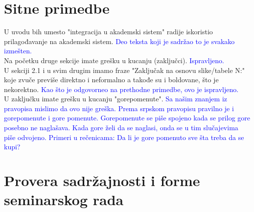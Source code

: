 \documentclass[a4paper]{report}
\newcommand{\odgovor}[1]{\textcolor{blue}{#1}}
\begin{document}
\section{Sitne primedbe}
U uvodu bih umesto "integracija u akademski sistem" radije iskoristio prilagođavanje na akademski sistem. \odgovor{Deo teksta koji je sadržao to je svakako izmešten.} \\
Na početku druge sekcije imate grešku u kucanju (zaključci). \odgovor{Ispravljeno.} \\
U sekciji 2.1 i u svim drugim imamo fraze "Zaključak na osnovu slike/tabele N:" koje zvuče previše direktno i neformalno a takođe su i boldovane, što je nekorektno. \odgovor{Kao što je odgovorneo na prethodne primedbe, ovo je ispravljeno.} \\
U zaključku imate grešku u kucanju "gorepomenute". \odgovor{Sa našim znanjem iz pravopisa mislimo da ovo nije greška. Prema srpskom pravopisu pravilno je i gorepomenute i gore pomenute. Gorepomenute se piše spojeno kada se prilog gore posebno ne naglašava. Kada gore želi da se naglasi, onda se u tim slučajevima piše odvojeno. Primeri u rečenicama: Da li je gore pomenuto sve šta treba da se kupi?}\\



\section{Provera sadržajnosti i forme seminarskog rada}
\end{document}
